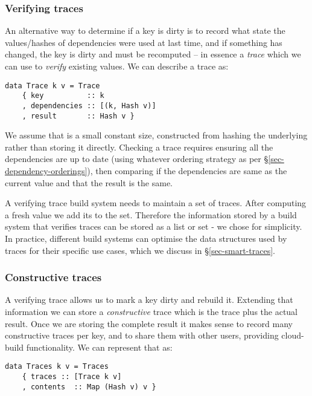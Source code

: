 \subsubsection{Verifying traces}\label{sec-verifying-traces}

An alternative way to determine if a key is dirty is to record what state the
values/hashes of dependencies were used at last time, and if something has
changed, the key is dirty and must be recomputed -- in essence a \emph{trace}
which we can use to \emph{verify} existing values. We can describe a trace as:

\begin{verbatim}
data Trace k v = Trace
    { key          :: k
    , dependencies :: [(k, Hash v)]
    , result       :: Hash v }
\end{verbatim}

We assume that  is a small constant size, constructed from hashing the
underlying  rather than storing it directly. Checking a trace requires
ensuring all the dependencies are up to date (using whatever ordering strategy
as per \S\ref{sec-dependency-orderings}), then comparing if the dependencies are
same as the current value and that the result is the same.

A verifying trace build system needs to maintain a set of traces. After computing a
fresh value we add its  to the set. Therefore the information stored
by a build system that verifies traces can be stored as a list or set - we chose \hs{[Trace k v]} for simplicity. In practice, different build systems can optimise the data structures used by traces for their specific use cases, which we discuss in \S\ref{sec-smart-traces}.

\subsubsection{Constructive traces}\label{sec-constructive-traces}

A verifying trace allows us to mark a key dirty and rebuild it. Extending that information we can store a \emph{constructive} trace which is the trace plus the actual result. Once we are storing the complete result it makes sense to record many constructive traces per key, and to share them with other users, providing cloud-build functionality. We can represent that as:

\begin{verbatim}
data Traces k v = Traces
    { traces :: [Trace k v]
    , contents  :: Map (Hash v) v }
\end{verbatim}

